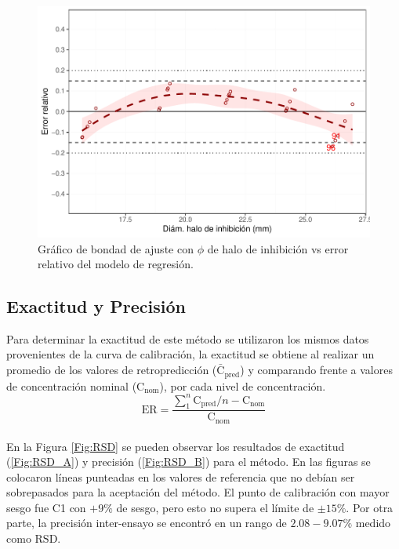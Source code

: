 \documentclass{article}
\begin{document}
\begin{figure}[H]
	\centering
	\includegraphics[width=0.8\linewidth]{Figuras/26_Grafico_error_diametro_halo.pdf}
	\caption[GOF error vs diámetro de halo]{Gráfico de bondad de ajuste con $\phi$ de halo de inhibición vs error relativo del modelo de regresión.}
	\label{Fig:6}
\end{figure}


\subsection{Exactitud y Precisión}\label{Exactitud}
Para determinar la exactitud de este método se utilizaron los mismos datos provenientes de la curva de calibración, la exactitud se obtiene al realizar un promedio de los valores de retropredicción ($ \mathrm{\bar{C}}_{\mathrm{pred}} $) y comparando frente a valores de concentración nominal ($ \mathrm{C}_{\mathrm{nom}} $), por cada nivel de concentración. \\

\begin{equation}\label{Eq:2}
	\mathrm{ER} = \frac{\sum_{1}^{n}{\mathrm{C_{pred}}/n - \mathrm{C_{nom}}}}{\mathrm{C_{nom}}}
\end{equation}\\

\noindent
En la Figura \ref{Fig:RSD} se pueden observar los resultados de exactitud (\ref{Fig:RSD_A}) y precisión (\ref{Fig:RSD_B}) para el método. En las figuras se colocaron líneas punteadas en los valores de referencia que no debían ser sobrepasados para la aceptación del método. El punto de calibración con mayor sesgo fue C1 con $ +9\% $ de sesgo, pero esto no supera el límite de $\pm15\% $. Por otra parte, la precisión inter-ensayo se encontró en un rango de $ 2.08-9.07\% $ medido como $ \mathrm{RSD} $. \\
\end{document}
